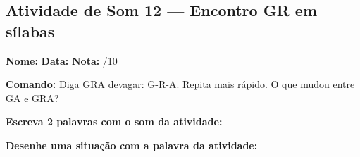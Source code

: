\subsection{Atividade de Som 12 --- Encontro GR em sílabas}
\begin{exercicio}



\noindent\textbf{Nome:} \underline{\hspace{3.2cm}} \quad \textbf{Data:} \underline{\hspace{1.6cm}} \quad \textbf{Nota:} \underline{\hspace{0.9cm}}/10


\noindent\textbf{Comando:} Diga GRA devagar: G-R-A. Repita mais rápido. O que mudou entre GA e GRA?


\begin{center}
\end{center}

\noindent\textbf{Escreva 2 palavras com o som da atividade:}

\begin{center}
  \underline{\hspace{3cm}} \quad \underline{\hspace{3cm}}
\end{center}

\noindent\textbf{Desenhe uma situação com a palavra da atividade:}

\begin{center}
\end{center}

\end{exercicio}



